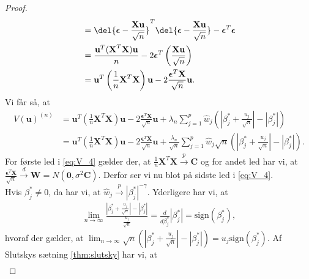 \begin{proof}
\begin{align*}
&= \del{\boldsymbol{\epsilon} - \frac{\textbf{X}\textbf{u}}{\sqrt{n}}}^T \del{\boldsymbol{\epsilon} - \frac{\textbf{X}\textbf{u}}{\sqrt{n}}} - \boldsymbol{\epsilon}^T \boldsymbol{\epsilon} \\
& = \frac{\textbf{u}^T (\textbf{X}^T\textbf{X})  \textbf{u}}{n} - 2 \boldsymbol{\epsilon}^T \left( \frac{\mathbf{X}\mathbf{u}}{\sqrt{n}} \right) \\ 
&= \textbf{u}^T \left(\frac{1}{n}\textbf{X}^T\textbf{X}\right)  \textbf{u}- 2 \frac{\boldsymbol{\epsilon}^T \textbf{X}}{\sqrt{n}}\textbf{u}.
\end{align*}
Vi får så, at 
\begin{align}
V(\mathbf{u})^{(n)} & = \textbf{u}^T \left(\frac{1}{n}\textbf{X}^T\textbf{X}\right)  \textbf{u} - 2 \frac{\boldsymbol{\epsilon}^T \textbf{X}}{\sqrt{n}}\textbf{u} + \lambda_n \sum_{j=1}^p \widehat{w}_j \left( \left\vert \beta_j^{*} + \frac{u_j}{\sqrt{n}} \right\vert - \left\vert \beta_j^{*}\right\vert
\right) \nonumber \\
 & = \textbf{u}^T \left(\frac{1}{n}\textbf{X}^T\textbf{X}\right)  \textbf{u} - 2 \frac{\boldsymbol{\epsilon}^T \textbf{X}}{\sqrt{n}}\textbf{u} +\frac{\lambda_n}{\sqrt{n}} \sum_{j=1}^p \widehat{w}_j \sqrt{n} \left( \left\vert \beta_j^{*} + \frac{u_j}{\sqrt{n}} \right\vert - \left\vert \beta_j^{*} \right\vert
\right). \label{eq:V_4}
\end{align}
%
For første led i \eqref{eq:V_4} gælder der, at $\frac{1}{n} \mathbf{X}^T \mathbf{X} \overset{p}{\rightarrow} \mathbf{C}$ og for andet led har vi, at $\frac{\boldsymbol{\epsilon}^T \mathbf{X}}{\sqrt{n}} \overset{d}{\rightarrow} \textbf{W}=N(\textbf{0},\sigma^2 \boldsymbol{C})$. 
Derfor ser vi nu blot på sidste led i \eqref{eq:V_4}. \\
Hvis $\beta_j^{*} \neq 0$, da har vi, at $\widehat{w}_j \overset{p}{\rightarrow} \left\vert \beta_j^{*} \right\vert^{-\gamma}$. Yderligere har vi, at 
\begin{align*}
\lim_{n\rightarrow \infty}
\frac{\left\vert \beta_j^{*} +\frac{u_j}{\sqrt{n}} \right\vert - \left\vert \beta_j^{*} \right\vert}{\frac{u_j}{\sqrt{n}}} =\frac{d}{d \beta_j^{*}} \left\vert \beta_j^{*} \right\vert =\text{sign}\left(\beta_j^{*} \right),
\end{align*} 
hvoraf der gælder, at $\lim_{n\rightarrow \infty} \sqrt{n} \left( \left\vert \beta_j^{*} +\frac{u_j}{\sqrt{n}} \right\vert - \left\vert \beta_j^{*} \right\vert \right) = u_j \text{sign}\left(\beta_j^{*} \right)$.
Af Slutskys sætning \ref{thm:slutsky} har vi, at 
\begin{align*}

\end{align*}
\end{proof}
